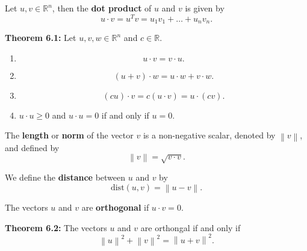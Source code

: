 \documentclass[12pt,letterpaper]{article}
\newcommand{\norm}[1]{\left\lVert#1\right\rVert}
\begin{document}
\newpage

\begin{defn} Let $u, v \in \mathbb{R}^n$, then the {\bf dot product} of $u$ and $v$ is given by $$u \cdot v= u^{T}v=u_1 v_1+\dots+ u_n v_n.$$
\end{defn}

{\bf Theorem 6.1:} Let $u, v, w \in \mathbb{R}^n$ and $c\in \mathbb{R}$.
\begin{enumerate}
\item $$ u \cdot v = v \cdot u.$$
\item $$(u+v)\cdot w= u \cdot w+ v \cdot w.$$
\item $$(cu)\cdot v = c(u\cdot v)= u \cdot (cv).$$
\item $u \cdot u \geq 0$ and $u \cdot u =0$ if and only if $u=0$.
\end{enumerate}

\begin{defn} The {\bf length} or {\bf norm} of the vector $v$ is a non-negative scalar, denoted by $\norm{v}$, and defined by $$\norm{v}= \sqrt{v\cdot v}.$$
\end{defn}

\begin{defn} We define the {\bf distance} between $u$ and $v$ by $$\text{dist}(u,v)=\norm{u-v}.$$
\end{defn}

\begin{defn} The vectors $u$ and $v$ are {\bf orthogonal} if $u\cdot v=0$.
\end{defn}

{\bf Theorem 6.2:} The vectors $u$ and $v$ are orthongal if and only if $$\norm{u}^2+\norm{v}^2=\norm{u+v}^2.$$
\end{document}
